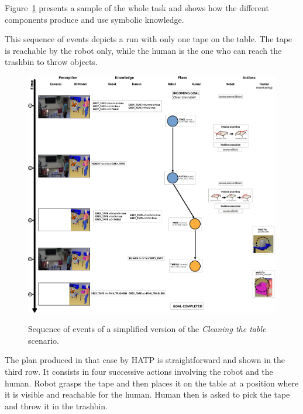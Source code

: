 \documentclass[preprint,3p,times]{elsarticle}
\begin{document}
Figure~\ref{fig|cleantable-timeline} presents a sample of the whole task and
shows how the different components produce and use symbolic knowledge.

This sequence of events depicts a run with only one tape on the table. The tape is
reachable by the robot only, while the human is the one who can reach the
trashbin to throw objects.

\begin{figure}[thpb]
  \centering
    \includegraphics[width=1.0\textwidth]{manip_run.pdf} \\
        \caption {Sequence of events of a simplified version of the \emph{Cleaning the table} scenario.}
  \label{fig|cleantable-timeline}
\end{figure}


The plan produced in that case by HATP is straightforward and shown in the
third row. It consists in four successive actions involving the robot and the
human. Robot grasps the tape and then places it on the table at a position
where it is visible and reachable for the human. Human then is asked to pick
the tape and throw it in the trashbin.

\end{document}
